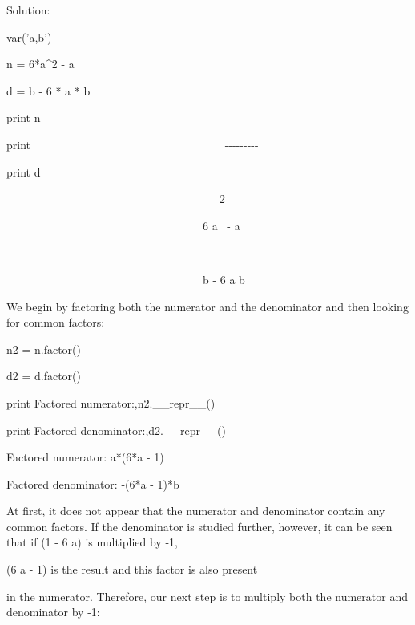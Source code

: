 \documentclass[12pt,oneside]{book}
\begin{document}
Solution:

{\textquotedbl}{\textquotedbl}{\textquotedbl}


var('a,b')

n = 6*a\^{}2 {}- a

d = b {}- 6 * a * b

print n

print {\textquotedbl}
\ \ \ \ \ \ \ \ \ \ \ \ \ \ \ \ \ \ \ \ \ \ \ \ \ \ \ \ \ \ \ \ \ \ {}-{}-{}-{}-{}-{}-{}-{}-{}-{\textquotedbl}

print d

{\textbar}

\ \ \ \ \ \ \ \ \ \ \ \ \ \ \ \ \ \ \ \ \ \ \ \ \ \ \ \ \ \ \ \ \ \ \ \ \ \ 2

\ \ \ \ \ \ \ \ \ \ \ \ \ \ \ \ \ \ \ \ \ \ \ \ \ \ \ \ \ \ \ \ \ \ \ 6
a \ {}- a

\ \ \ \ \ \ \ \ \ \ \ \ \ \ \ \ \ \ \ \ \ \ \ \ \ \ \ \ \ \ \ \ \ \ \ {}-{}-{}-{}-{}-{}-{}-{}-{}-

\ \ \ \ \ \ \ \ \ \ \ \ \ \ \ \ \ \ \ \ \ \ \ \ \ \ \ \ \ \ \ \ \ \ \ b
{}- 6 a b


{\textquotedbl}{\textquotedbl}{\textquotedbl}

We begin by factoring both the numerator and the denominator and then looking for common factors:

{\textquotedbl}{\textquotedbl}{\textquotedbl}

n2 = n.factor()

d2 = d.factor()

print {\textquotedbl}Factored numerator:{\textquotedbl},n2.\_\_repr\_\_()

print {\textquotedbl}Factored denominator:{\textquotedbl},d2.\_\_repr\_\_()

{\textbar}

Factored numerator: a*(6*a {}- 1)

Factored denominator: {}-(6*a {}- 1)*b


{\textquotedbl}{\textquotedbl}{\textquotedbl}

At first, it does not appear that the numerator and denominator contain any common factors. If the denominator is studied further, however, it can be seen that if (1 {}- 6 a) is multiplied by {}-1, 

(6 a {}- 1) is the result and this factor is also present

in the numerator. Therefore, our next step is to multiply both the numerator and denominator by {}-1:

{\textquotedbl}{\textquotedbl}{\textquotedbl}
\end{document}
